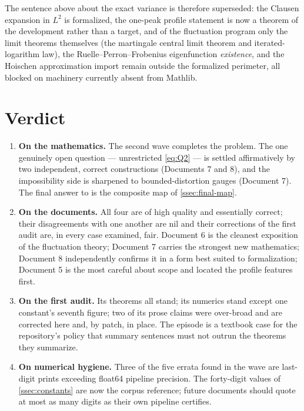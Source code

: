 \documentclass[11pt,oneside]{article}
\theoremstyle{definition}
\theoremstyle{remark}
\begin{document}
The sentence above about the exact variance is therefore superseded:
the Clausen expansion in $L^2$ is formalized, the one-peak profile
statement is now a theorem of the development rather than a target,
and of the fluctuation program only the limit theorems themselves
(the martingale central limit theorem and iterated-logarithm law),
the Rue\-lle--Perron--Frobenius eigenfunction \emph{existence}, and
the Hoischen approximation import remain outside the formalized
perimeter, all blocked on machinery currently absent from Mathlib.

\section{Verdict}
\label{sec:verdict}

\begin{enumerate}
\item \textbf{On the mathematics.}  The second wave completes the
problem.  The one genuinely open question --- unrestricted
\eqref{eq:Q2} --- is settled affirmatively by two independent, correct
constructions (Documents 7 and 8), and the impossibility side is
sharpened to bounded-distortion gauges (Document 7).  The final answer
to \cite{mse-decay} is the composite map of \cref{ssec:final-map}.
\item \textbf{On the documents.}  All four are of high quality and
essentially correct; their disagreements with one another are nil and
their corrections of the first audit are, in every case examined, fair.
Document 6 is the cleanest exposition of the fluctuation theory;
Document 7 carries the strongest new mathematics; Document 8
independently confirms it in a form best suited to formalization;
Document 5 is the most careful about scope and located the profile
features first.
\item \textbf{On the first audit.}  Its theorems all stand; its
numerics stand except one constant's seventh figure; two of its prose
claims were over-broad and are corrected here and, by patch, in place.
The episode is a textbook case for the repository's policy that
summary sentences must not outrun the theorems they summarize.
\item \textbf{On numerical hygiene.}  Three of the five errata found in
the wave are last-digit prints exceeding float64 pipeline precision.
The forty-digit values of \cref{ssec:constants} are now the corpus
reference; future documents should quote at most as many digits as
their own pipeline certifies.
\end{enumerate}
\end{document}
